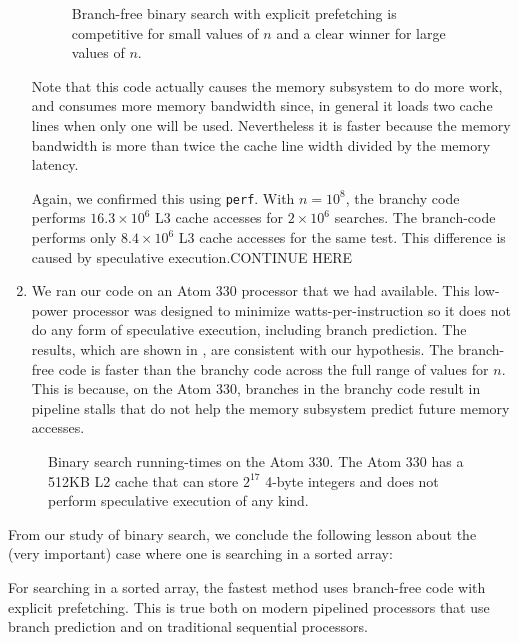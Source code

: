 \documentclass{patmorin}
\begin{document}
\begin{enumerate}
\begin{figure}
   \caption{Branch-free binary search with explicit prefetching is competitive
    for small values of $n$ and a clear winner for large values of $n$.}
\end{figure}

   Note that this code actually causes the memory subsystem to do more
   work, and consumes more memory bandwidth since, in general it loads
   two cache lines when only one will be used.  Nevertheless it is faster
   because the memory bandwidth is more than twice the cache line width
   divided by the memory latency.

   Again, we confirmed this using \texttt{perf}.  With $n=10^8$,
   the branchy code performs $16.3\times 10^6$ L3 cache accesses for
   $2\times 10^6$ searches.  The branch-code performs only
   $8.4\times 10^6$ L3 cache accesses for the same test.  This difference is caused by speculative execution.CONTINUE HERE


\item We ran our code on an Atom 330 processor that we had available. This
   low-power processor was designed to minimize watts-per-instruction
   so it does not do any form of speculative execution, including
   branch prediction. The results, which are shown in ,
   are consistent with our hypothesis.  The branch-free code is faster
   than the branchy code across the full range of values for $n$.
   This is because, on the Atom 330, branches in the branchy code result
   in pipeline stalls that do not help the memory subsystem predict
   future memory accesses.
\end{enumerate}

\begin{figure}
   \caption{Binary search running-times on the Atom 330. The Atom 330
   has a 512KB L2 cache that can store $2^{17}$ 4-byte integers and does
   not perform speculative execution of any kind.}
\end{figure}

From our study of binary search, we conclude the following lesson about
the (very important) case where one is searching in a sorted array:

\begin{lesson}
  For searching in a sorted array, the fastest method uses branch-free
  code with explicit prefetching.  This is true both on modern pipelined
  processors that use branch prediction and on traditional sequential
  processors.
\end{lesson}
\end{document}
